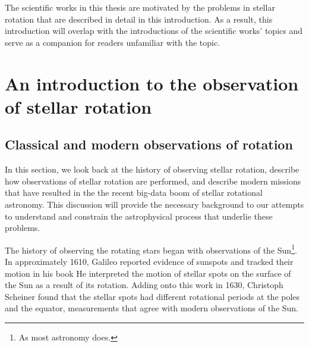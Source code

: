 The scientific works in this thesis are motivated by the problems in stellar rotation that are described in detail in this introduction. As a result, this introduction will overlap with the introductions of the scientific works' topics and serve as a companion for readers unfamiliar with the topic.

\section{An introduction to the observation of stellar rotation}
\label{sec:history}

\subsection{Classical and modern observations of rotation}

In this section, we look back at the history of observing stellar rotation, describe how observations of stellar rotation are performed, and describe modern missions that have resulted in the the recent big-data boom of stellar rotational astronomy.
This discussion will provide the necessary background to our attempts to understand and constrain the astrophysical process that underlie these problems.

The history of observing the rotating stars began with observations of the Sun\footnote{As most astronomy does.}. 
In approximately 1610, Galileo reported evidence of sunspots and tracked their motion in his book  
He interpreted the motion of stellar spots on the surface of the Sun as a result of its rotation. 
Adding onto this work in 1630, Christoph Scheiner found that the stellar spots had different rotational periods at the poles and the equator, measurements that agree with modern observations of the Sun. 

